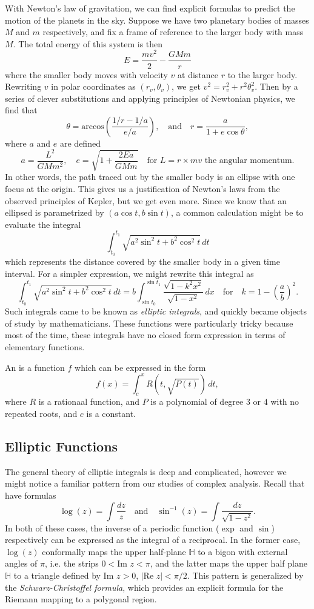 \documentclass{lkx_paper}
\begin{document}
With Newton's law of gravitation, we can find explicit formulas to predict the motion of the planets in the sky. Suppose we have two planetary bodies of masses $M$ and $m$ respectively, and fix a frame of reference to the larger body with mass $M$. The total energy of this system is then
\[
	E = \frac{mv^2}{2} - \frac{GMm}{r}
\]
where the smaller body moves with velocity $v$ at distance $r$ to the larger body.
Rewriting $v$ in polar coordinates as $(r_v, \theta_v)$, we get $v^2 = r_v^2 + r^2\theta_v^2$. Then by a series of clever substitutions and applying principles of Newtonian physics, we find that
\[
	\theta = \textrm{arccos}\left(\frac{1/r - 1/a}{e/a}\right),\quad\textrm{and}\quad r=\frac{a}{1+e\cos\theta},
\]
where $a$ and $e$ are defined
\[
	a=\frac{L^2}{GMm^2},\quad e=\sqrt{1+\frac{2Ea}{GMm}}\quad\textrm{for } L=r\times mv\textrm{ the angular momentum.}
\]
In other words, the path traced out by the smaller body is an ellipse with one focus at the origin. This gives us a justification of Newton's laws from the observed principles of Kepler, but we get even more. Since we know that an ellipsed is parametrized by $(a\cos t, b\sin t)$, a common calculation might be to evaluate the integral
\[
	\int_{t_0}^{t_1} \sqrt{a^2\sin^2 t + b^2\cos^2 t}\,dt
\]
which represents the distance covered by the smaller body in a given time interval. For a simpler expression, we might rewrite this integral as
\[
	\int_{t_0}^{t_1} \sqrt{a^2\sin^2 t + b^2\cos^2 t}\,dt = b\int_{\sin t_0}^{\sin t_1} \frac{\sqrt{1-k^2x^2}}{\sqrt{1-x^2}}\,dx\quad\textrm{for}\quad k = 1 - \left(\frac{a}{b}\right)^2.
\]
Such integrals came to be known as \emph{elliptic integrals}, and quickly became objects of study by mathematicians. These functions were particularly tricky because most of the time, these integrals have no closed form expression in terms of elementary functions.
\begin{definition}
	An  is a function $f$ which can be expressed in the form
	\[
		f(x) = \int_c^x R(t, \sqrt{P(t)})\,dt,
	\]
	where $R$ is a rationaal function, and $P$ is a polynomial of degree $3$ or $4$ with no repeated roots, and $c$ is a constant.
\end{definition}

\subsection{Elliptic Functions}
The general theory of elliptic integrals is deep and complicated, however we might notice a familiar pattern from our studies of complex analysis. Recall that have formulas
\[
	\log(z) = \int \frac{dz}{z}\quad\textrm{and}\quad \sin^{-1}(z) = \int\frac{dz}{\sqrt{1-z^2}}.
\]
In both of these cases, the inverse of a periodic function ($\exp$ and $\sin$) respectively can be expressed as the integral of a reciprocal. In the former case, $\log(z)$ conformally maps the upper half-plane $\mathbb{H}$ to a bigon with external angles of $\pi$, i.e. the strips $0<\textrm{Im } z<\pi$, and the latter maps the upper half plane $\mathbb{H}$ to a triangle defined by $\textrm{Im } z > 0$, $|\textrm{Re }z| < \pi/2$. This pattern is generalized by the \emph{Schwarz-Christoffel formula}, which provides an explicit formula for the Riemann mapping to a polygonal region.
\end{document}
